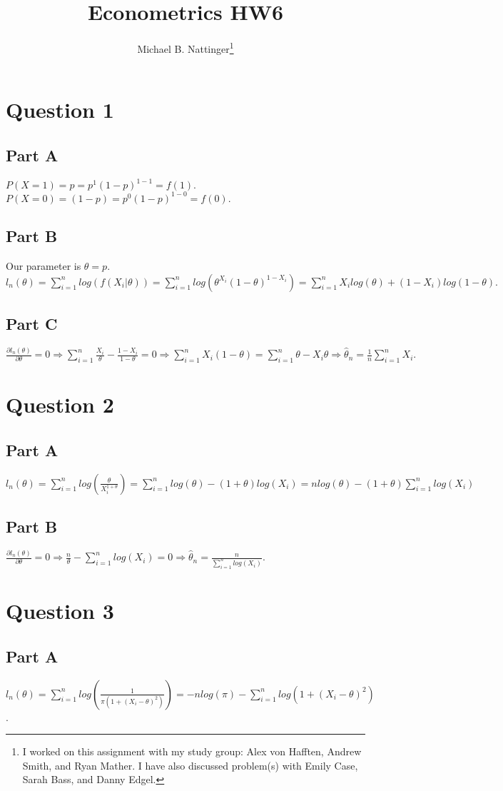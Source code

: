 \documentclass[11pt]{article} %
\title{Econometrics HW6}
\author{Michael B. Nattinger\footnote{I worked on this assignment with my study group: Alex von Hafften, Andrew Smith, and Ryan Mather. I have also discussed problem(s) with Emily Case, Sarah Bass, and Danny Edgel.}}
\begin{document}
\maketitle

\section{Question 1} %
\subsection{Part A}
$P(X=1) = p = p^{1}(1-p)^{1-1} = f(1).$ $P(X=0) = (1-p) = p^0(1-p)^{1-0} = f(0).$
\subsection{Part B}
Our parameter is $\theta = p.$ $l_n(\theta) = \sum_{i=1}^nlog(f(X_i|\theta)) = \sum_{i=1}^nlog(\theta^{X_i}(1-\theta)^{1-X_i})= \sum_{i=1}^nX_i log(\theta) + (1-X_i)log(1-\theta).$
\subsection{Part C}
$\frac{\partial l_n(\theta)}{\partial \theta} = 0 \Rightarrow \sum_{i=1}^n \frac{X_i}{\theta} -\frac{1-X_i}{1-\theta} = 0 \Rightarrow \sum_{i=1}^n X_i(1-\theta) = \sum_{i=1}^n \theta - X_i\theta \Rightarrow  \hat{\theta}_n = \frac{1}{n}\sum_{i=1}^nX_i.$
\section{Question 2} %
\subsection{Part A}
$l_n(\theta) = \sum_{i=1}^n log\left(\frac{\theta}{X_i^{1+\theta}}\right) = \sum_{i=1}^n log(\theta) - (1+\theta) log(X_i) = nlog(\theta) - (1+\theta) \sum_{i=1}^n log(X_i) $
\subsection{Part B}
$\frac{\partial l_n(\theta)}{\partial \theta} = 0 \Rightarrow \frac{n}{\theta} - \sum_{i=1}^n log(X_i) =0 \Rightarrow \hat{\theta}_n = \frac{n}{\sum_{i=1}^n log(X_i)}  $.
\section{Question 3} %
\subsection{Part A}
$l_n(\theta) = \sum_{i=1}^n log\left(\frac{1}{\pi(1+(X_i- \theta)^2)}\right) = - nlog(\pi) - \sum_{i=1}^n log(1 +(X_i- \theta)^2) $.
\end{document}
